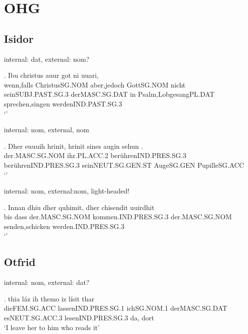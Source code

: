 
\chapter{OHG}

\section{Isidor}

internal: dat, external: nom?

\exg. Ibu christus auur got ni uuari,     \\
wenn,falls ChristusSG.NOM aber,jedoch GottSG.NOM nicht seinSUBJ.PAST.SG.3 derMASC.SG.DAT in Psalm,LobgesangPL.DAT sprechen,singen werdenIND.PAST.SG.3\\
`' 


internal: nom, external, nom

\exg. Dher euuuih hrinit, hrinit sines augin sehun .\\
 der.MASC.SG.NOM ihr.PL.ACC.2 berührenIND.PRES.SG.3 berührenIND.PRES.SG.3 seinNEUT.SG.GEN.ST AugeSG.GEN PupilleSG.ACC\\
`' 


internal: nom, external:nom, light-headed!

\exg. Innan dhiu dher quhimit, dher chisendit uuirdhit\\
bis dass der.MASC.SG.NOM kommen.IND.PRES.SG.3  der.MASC.SG.NOM senden,schicken werden.IND.PRES.SG.3\\
`' 


\phantom{x}

\section{Otfrid}

internal: nom, external: dat?

\exg. thia	láz	ih	themo	iz	lísit	thar\\
dieFEM.SG.ACC	lassenIND.PRES.SG.1	ichSG.NOM.1	derMASC.SG.DAT	esNEUT.SG.ACC.3	lesenIND.PRES.SG.3	da, dort\\
`I leave her to him who reads it' 


